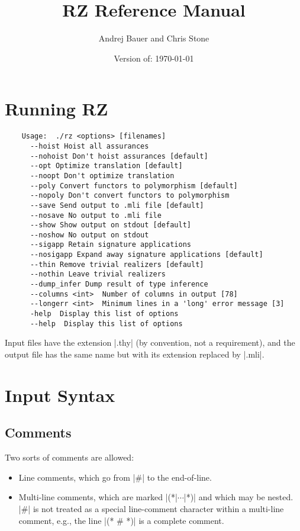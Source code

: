 \documentclass[11pt]{article}
\title{RZ Reference Manual}
\date{Version of: \today}
\author{Andrej Bauer and Chris Stone}
\begin{document}
\maketitle

\VerbatimFootnotes

\section{Running RZ}

\begin{Verbatim}
	Usage:  ./rz <options> [filenames]
	  --hoist Hoist all assurances
	  --nohoist Don't hoist assurances [default]
	  --opt Optimize translation [default]
	  --noopt Don't optimize translation
	  --poly Convert functors to polymorphism [default]
	  --nopoly Don't convert functors to polymorphism
	  --save Send output to .mli file [default]
	  --nosave No output to .mli file
	  --show Show output on stdout [default]
	  --noshow No output on stdout
	  --sigapp Retain signature applications
	  --nosigapp Expand away signature applications [default]
	  --thin Remove trivial realizers [default]
	  --nothin Leave trivial realizers
	  --dump_infer Dump result of type inference
	  --columns <int>  Number of columns in output [78]
	  --longerr <int>  Minimum lines in a 'long' error message [3]
	  -help  Display this list of options
	  --help  Display this list of options
\end{Verbatim}

Input files have the extension |.thy| (by convention, not a requirement), and the 
output file has the same name but with its extension replaced by |.mli|.

\section{Input Syntax}

\subsection{Comments}

Two sorts of comments are allowed:
\begin{itemize}
\item Line comments, which go from |#| to the end-of-line.
\item Multi-line comments, which are marked |(*|$\cdots$|*)| and which may be nested.  |#| is not treated as a
  special line-comment character within a multi-line comment, e.g.,
  the line |(* # *)| is a complete comment.
\end{itemize}
\end{document}
